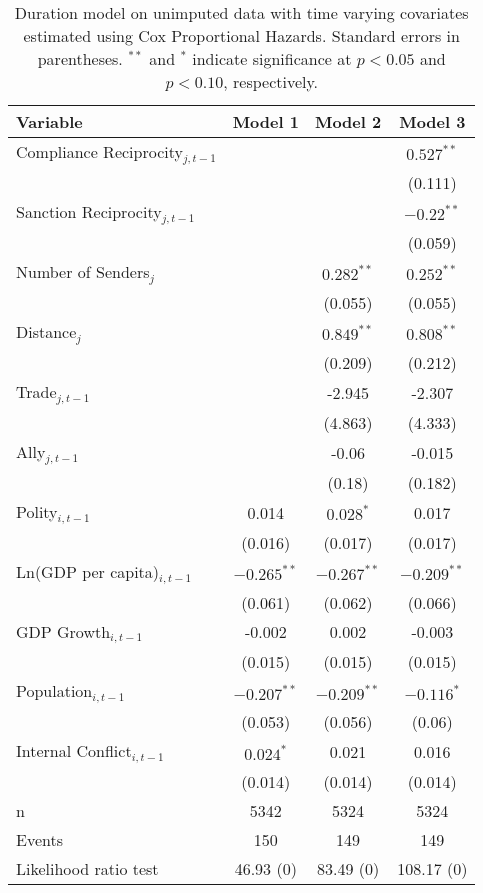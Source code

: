 \begin{table}[ht]
\centering
\begingroup\normalsize
\begin{tabular}{lccc}
 Variable & Model 1 & Model 2 & Model 3 \\ 
  \hline
\hline
Compliance Reciprocity$_{j,t-1}$ &  &  & $0.527^{\ast\ast}$ \\ 
   &  &  & (0.111) \\ 
  Sanction Reciprocity$_{j,t-1}$ &  &  & $-0.22^{\ast\ast}$ \\ 
   &  &  & (0.059) \\ 
   \hline
Number of Senders$_{j}$ &  & $0.282^{\ast\ast}$ & $0.252^{\ast\ast}$ \\ 
   &  & (0.055) & (0.055) \\ 
  Distance$_{j}$ &  & $0.849^{\ast\ast}$ & $0.808^{\ast\ast}$ \\ 
   &  & (0.209) & (0.212) \\ 
  Trade$_{j,t-1}$ &  & -2.945 & -2.307 \\ 
   &  & (4.863) & (4.333) \\ 
  Ally$_{j,t-1}$ &  & -0.06 & -0.015 \\ 
   &  & (0.18) & (0.182) \\ 
   \hline
Polity$_{i,t-1}$ & 0.014 & $0.028^{\ast}$ & 0.017 \\ 
   & (0.016) & (0.017) & (0.017) \\ 
  Ln(GDP per capita)$_{i,t-1}$ & $-0.265^{\ast\ast}$ & $-0.267^{\ast\ast}$ & $-0.209^{\ast\ast}$ \\ 
   & (0.061) & (0.062) & (0.066) \\ 
  GDP Growth$_{i,t-1}$ & -0.002 & 0.002 & -0.003 \\ 
   & (0.015) & (0.015) & (0.015) \\ 
  Population$_{i,t-1}$ & $-0.207^{\ast\ast}$ & $-0.209^{\ast\ast}$ & $-0.116^{\ast}$ \\ 
   & (0.053) & (0.056) & (0.06) \\ 
  Internal Conflict$_{i,t-1}$ & $0.024^{\ast}$ & 0.021 & 0.016 \\ 
   & (0.014) & (0.014) & (0.014) \\ 
   \hline
n & 5342 & 5324 & 5324 \\ 
  Events & 150 & 149 & 149 \\ 
  Likelihood ratio test & 46.93 (0) & 83.49 (0) & 108.17 (0) \\ 
   \hline
\hline
\end{tabular}
\endgroup
\caption{Duration model on unimputed data with time varying covariates estimated using Cox Proportional Hazards. Standard errors in parentheses. $^{**}$ and $^{*}$ indicate significance at $p< 0.05 $ and $p< 0.10 $, respectively.} 
\label{tab:regResultsNoImp}
\end{table}
